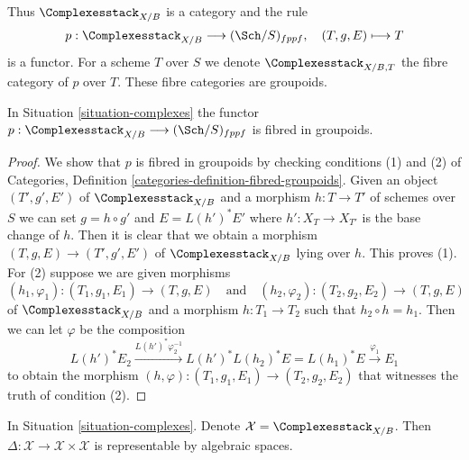 \noindent
Thus $\Complexesstack_{X/B}$ is a category and the rule
$$
p : \Complexesstack_{X/B} \longrightarrow (\Sch/S)_{fppf},
\quad
(T, g, E) \longmapsto T
$$
is a functor. For a scheme $T$ over $S$ we denote $\Complexesstack_{X/B, T}$
the fibre category of $p$ over $T$. These fibre categories are groupoids.

\begin{lemma}
\label{lemma-complexes-fibred-in-groupoids}
In Situation \ref{situation-complexes} the functor
$p : \Complexesstack_{X/B} \longrightarrow (\Sch/S)_{fppf}$
is fibred in groupoids.
\end{lemma}

\begin{proof}
We show that $p$ is fibred in groupoids by checking conditions
(1) and (2) of Categories, Definition
\ref{categories-definition-fibred-groupoids}.
Given an object $(T', g', E')$
of $\Complexesstack_{X/B}$ and a morphism $h : T \to T'$ of
schemes over $S$ we can set $g = h \circ g'$ and
$E = L(h')^*E'$ where $h' : X_T \to X_{T'}$
is the base change of $h$. Then it is clear that we obtain
a morphism $(T, g, E) \to (T', g', E')$
of $\Complexesstack_{X/B}$ lying over $h$. This proves (1).
For (2) suppose we are given morphisms
$$
(h_1, \varphi_1) : (T_1, g_1, E_1) \to (T, g, E)
\quad\text{and}\quad
(h_2, \varphi_2) : (T_2, g_2, E_2) \to (T, g, E)
$$
of $\Complexesstack_{X/B}$ and a morphism $h : T_1 \to T_2$ such that
$h_2 \circ h = h_1$. Then we can let $\varphi$ be the composition
$$
L(h')^*E_2
\xrightarrow{L(h')^*\varphi_2^{-1}}
L(h')^*L(h_2)^*E = L(h_1)^*E
\xrightarrow{\varphi_1}
E_1
$$
to obtain the morphism
$(h, \varphi) : (T_1, g_1, E_1) \to (T_2, g_2, E_2)$
that witnesses the truth of condition (2).
\end{proof}

\begin{lemma}
\label{lemma-complexes-diagonal}
In Situation \ref{situation-complexes}. Denote
$\mathcal{X} = \Complexesstack_{X/B}$. Then
$\Delta : \mathcal{X} \to \mathcal{X} \times \mathcal{X}$ is
representable by algebraic spaces.
\end{lemma}

